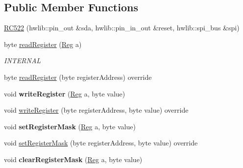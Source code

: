 \subsection*{Public Member Functions}
\begin{DoxyCompactItemize}
\item 
\hyperlink{class_r_c522_afe9b5dc493a0768dae120a869dc5af12}{R\+C522} (hwlib\+::pin\+\_\+out \&sda, hwlib\+::pin\+\_\+in\+\_\+out \&reset, hwlib\+::spi\+\_\+bus \&spi)
\item 
byte \hyperlink{class_r_c522_ad824f9c57546a79af49cdd9da960275b}{read\+Register} (\hyperlink{class_r_c522_a7bf90c1bc00e047a687a30948f18a431}{Reg} a)\hypertarget{class_r_c522_ad824f9c57546a79af49cdd9da960275b}{}\label{class_r_c522_ad824f9c57546a79af49cdd9da960275b}

\begin{DoxyCompactList}\small\item\em I\+N\+T\+E\+R\+N\+AL \end{DoxyCompactList}\item 
byte \hyperlink{class_r_c522_a5de4e5d16b9d54c859f6db3de68c8147}{read\+Register} (byte register\+Address) override
\item 
void {\bfseries write\+Register} (\hyperlink{class_r_c522_a7bf90c1bc00e047a687a30948f18a431}{Reg} a, byte value)\hypertarget{class_r_c522_a91323f954046f4753c05baded14042dc}{}\label{class_r_c522_a91323f954046f4753c05baded14042dc}

\item 
void \hyperlink{class_r_c522_a8860f482253b39808658bf5cdbbe342d}{write\+Register} (byte register\+Address, byte value) override
\item 
void {\bfseries set\+Register\+Mask} (\hyperlink{class_r_c522_a7bf90c1bc00e047a687a30948f18a431}{Reg} a, byte value)\hypertarget{class_r_c522_ab16643abb4c08a913eeb416e65a7f739}{}\label{class_r_c522_ab16643abb4c08a913eeb416e65a7f739}

\item 
void \hyperlink{class_r_c522_a14cc49cb3afd67164ebceffdb38dd605}{set\+Register\+Mask} (byte register\+Address, byte value) override
\item 
void {\bfseries clear\+Register\+Mask} (\hyperlink{class_r_c522_a7bf90c1bc00e047a687a30948f18a431}{Reg} a, byte value)\hypertarget{class_r_c522_a4c29b2496dcb91f20b0b4ec253768473}{}\label{class_r_c522_a4c29b2496dcb91f20b0b4ec253768473}


\end{DoxyCompactItemize}
